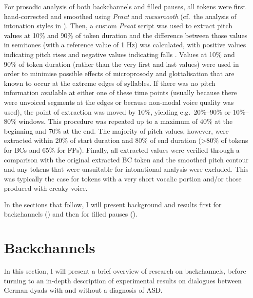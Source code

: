 For prosodic analysis of both backchannels and filled pauses, all tokens were first hand-corrected and smoothed using \textit{Praat} \citep{boersmaPRAATDoingPhonetics2021} and \emph{mausmooth} \citep{cangemiMausmooth2015a} (cf.~the analysis of intonation styles in ). Then, a custom \textit{Praat} script was used to extract pitch values at 10\% and 90\% of token duration and the difference between those values in semitones (with a reference value of 1 Hz) was calculated, with positive values indicating pitch rises and negative values indicating falls \citep[cf.][]{haSpeechProsodyPossible2016,sbrannaBackchannellingLanguagesRate2022}. Values at 10\% and 90\% of token duration (rather than the very first and last values) were used in order to minimise possible effects of microprosody and glottalisation that are known to occur at the extreme edges of syllables. If there was no pitch information available at either one of these time points (usually because there were unvoiced segments at the edges or because non-modal voice quality was used), the point of extraction was moved by 10\%, yielding e.g.~20\%--90\% or 10\%--80\% windows. This procedure was repeated up to a maximum of 40\% at the beginning and 70\% at the end. The majority of pitch values, however, were extracted within 20\% of start duration and 80\% of end duration (\textgreater80\% of tokens for BCs and 65\% for FPs). Finally, all extracted values were verified through a comparison with the original extracted BC token and the smoothed pitch contour and any tokens that were unsuitable for intonational analysis were excluded. This was typically the case for tokens with a very short vocalic portion and/or those produced with creaky voice.


In the sections that follow, I will present background and results first for backchannels () and then for filled pauses ().








\section{Backchannels}\label{sec:BCFP_BC}

In this section, I will present a brief overview of research on backchannels, before turning to an in-depth description of experimental results on dialogues between German dyads with and without a diagnosis of ASD. 

